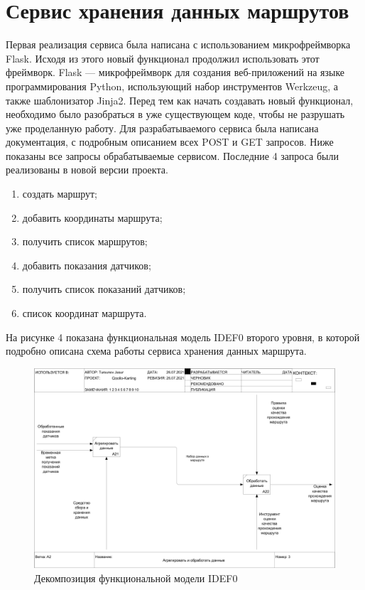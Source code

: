 \documentclass[a4paper, 10pt]{article}
\begin{document}
	\section{Сервис хранения данных маршрутов}
	\hspace*{5mm} Первая реализация сервиса была написана с использованием микрофреймворка Flask. Исходя из этого новый функционал продолжил использовать этот фреймворк. Flask — микрофреймворк для создания веб-приложений на языке программирования Python, использующий набор инструментов Werkzeug, а также шаблонизатор Jinja2. Перед тем как начать создавать новый функционал, необходимо было разобраться в уже существующем коде, чтобы не разрушать уже проделанную работу. Для разрабатываемого сервиса была написана документация, с подробным описанием всех POST и GET запросов. Ниже показаны все запросы обрабатываемые сервисом. Последние 4 запроса были реализованы в новой версии проекта.
	\begin{enumerate}
		\item создать маршрут;
		\item добавить координаты маршрута;
		\item получить список маршрутов;
		\item добавить показания датчиков;
		\item получить список показаний датчиков;
		\item список координат маршрута.
	\end{enumerate}
	На рисунке 4 показана функциональная модель IDEF0 второго уровня, в которой подробно описана схема работы сервиса хранения данных маршрута. 
	\begin{figure}[h!]
		\centering
		\includegraphics[scale=0.25]{idef2}
		\centering\caption{Декомпозиция функциональной модели IDEF0}
	\end{figure}  
\end{document}
